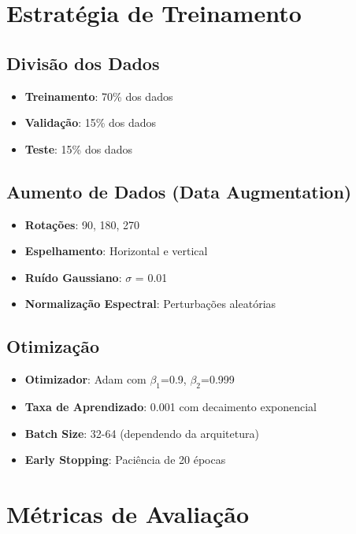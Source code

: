 \section{Estratégia de Treinamento}\label{sec:treinamento}

\subsection{Divisão dos Dados}
\begin{itemize}
    \item \textbf{Treinamento}: 70\% dos dados
    \item \textbf{Validação}: 15\% dos dados
    \item \textbf{Teste}: 15\% dos dados
\end{itemize}

\subsection{Aumento de Dados (Data Augmentation)}
\begin{itemize}
    \item \textbf{Rotações}: 90\textdegree, 180\textdegree, 270\textdegree
    \item \textbf{Espelhamento}: Horizontal e vertical
    \item \textbf{Ruído Gaussiano}: $\sigma$ = 0.01
    \item \textbf{Normalização Espectral}: Perturbações aleatórias
\end{itemize}

\subsection{Otimização}
\begin{itemize}
    \item \textbf{Otimizador}: Adam com $\beta_1$=0.9, $\beta_2$=0.999
    \item \textbf{Taxa de Aprendizado}: 0.001 com decaimento exponencial
    \item \textbf{Batch Size}: 32-64 (dependendo da arquitetura)
    \item \textbf{Early Stopping}: Paciência de 20 épocas
\end{itemize}

\section{Métricas de Avaliação}\label{sec:metricas}

